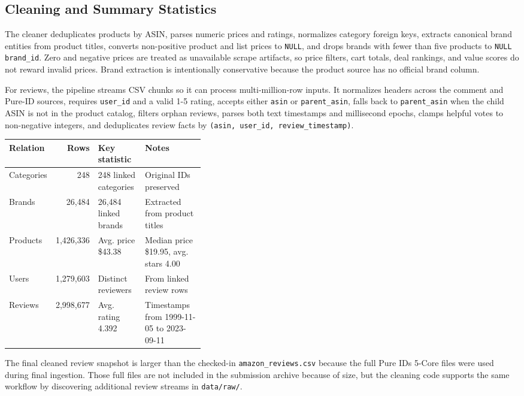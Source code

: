 \documentclass[10pt]{article}
\begin{document}
\subsection{Cleaning and Summary Statistics}
The cleaner deduplicates products by ASIN, parses numeric prices and ratings,
normalizes category foreign keys, extracts canonical brand entities from product
titles, converts non-positive product and list prices to \texttt{NULL}, and
drops brands with fewer than five products to \texttt{NULL brand\_id}. Zero and
negative prices are treated as unavailable scrape artifacts, so price filters,
cart totals, deal rankings, and value scores do not reward invalid prices. Brand
extraction is intentionally conservative because the product source has no
official brand column.

For reviews, the pipeline streams CSV chunks so it can process multi-million-row
inputs. It normalizes headers across the comment and Pure-ID sources, requires
\texttt{user\_id} and a valid 1-5 rating, accepts either \texttt{asin} or
\texttt{parent\_asin}, falls back to \texttt{parent\_asin} when the child ASIN is
not in the product catalog, filters orphan reviews, parses both text timestamps
and millisecond epochs, clamps helpful votes to non-negative integers, and
deduplicates review facts by \texttt{(asin, user\_id, review\_timestamp)}.

\begin{center}
\begin{tabularx}{\linewidth}{@{}L{0.14\linewidth}rL{0.24\linewidth}Y@{}}
\toprule
Relation & Rows & Key statistic & Notes \\
\midrule
Categories & 248 & 248 linked categories & Original IDs preserved \\
Brands & 26,484 & 26,484 linked brands & Extracted from product titles \\
Products & 1,426,336 & Avg. price \$43.38 & Median price \$19.95, avg. stars 4.00 \\
Users & 1,279,603 & Distinct reviewers & From linked review rows \\
Reviews & 2,998,677 & Avg. rating 4.392 & Timestamps from 1999-11-05 to 2023-09-11 \\
\bottomrule
\end{tabularx}
\end{center}

The final cleaned review snapshot is larger than the checked-in
\texttt{amazon\_reviews.csv} because the full Pure IDs 5-Core files were used
during final ingestion. Those full files are not included in the submission
archive because of size, but the cleaning code supports the same workflow by
discovering additional review streams in \texttt{data/raw/}.
\end{document}
